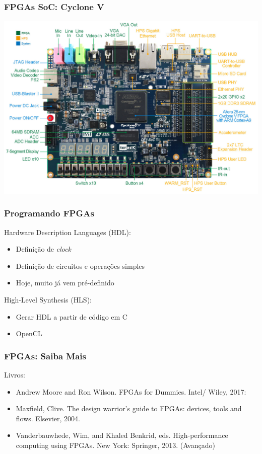 \documentclass[10pt, compress]{beamer}
\begin{document}
\begin{frame}
    \frametitle{FPGAs SoC: Cyclone V}
    \begin{center}
        \includegraphics[width=\textwidth]{cycloneV}
    \end{center}
\end{frame}

\begin{frame}
    \frametitle{Programando FPGAs}
    Hardware Description Languages (\alert{HDL}):
    \begin{itemize}
        \item Definição de \textit{clock}
        \item Definição de circuitos e operações simples
        \item Hoje, muito já vem pré-definido
    \end{itemize}

    \pause

    High-Level Synthesis (\alert{HLS}):
    \begin{itemize}
        \item Gerar HDL a partir de \alert{código em C}
        \item \alert{OpenCL}
    \end{itemize}
\end{frame}

\begin{frame}
    \frametitle{FPGAs: Saiba Mais}
    Livros:

    \begin{itemize}
        \item Andrew Moore and Ron Wilson. FPGAs for Dummies. Intel/ Wiley, 2017:
        \item Maxfield, Clive. The design warrior's guide to FPGAs: devices, tools and flows. Elsevier, 2004.
        \item Vanderbauwhede, Wim, and Khaled Benkrid, eds. High-performance computing using FPGAs. New York: Springer, 2013. (Avançado)
    \end{itemize}
\end{frame}
\end{document}

